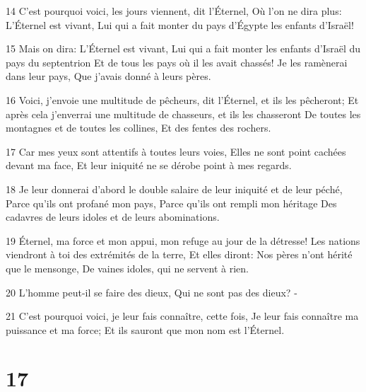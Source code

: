 \par 14 C'est pourquoi voici, les jours viennent, dit l'Éternel, Où l'on ne dira plus: L'Éternel est vivant, Lui qui a fait monter du pays d'Égypte les enfants d'Israël!
\par 15 Mais on dira: L'Éternel est vivant, Lui qui a fait monter les enfants d'Israël du pays du septentrion Et de tous les pays où il les avait chassés! Je les ramènerai dans leur pays, Que j'avais donné à leurs pères.
\par 16 Voici, j'envoie une multitude de pêcheurs, dit l'Éternel, et ils les pêcheront; Et après cela j'enverrai une multitude de chasseurs, et ils les chasseront De toutes les montagnes et de toutes les collines, Et des fentes des rochers.
\par 17 Car mes yeux sont attentifs à toutes leurs voies, Elles ne sont point cachées devant ma face, Et leur iniquité ne se dérobe point à mes regards.
\par 18 Je leur donnerai d'abord le double salaire de leur iniquité et de leur péché, Parce qu'ils ont profané mon pays, Parce qu'ils ont rempli mon héritage Des cadavres de leurs idoles et de leurs abominations.
\par 19 Éternel, ma force et mon appui, mon refuge au jour de la détresse! Les nations viendront à toi des extrémités de la terre, Et elles diront: Nos pères n'ont hérité que le mensonge, De vaines idoles, qui ne servent à rien.
\par 20 L'homme peut-il se faire des dieux, Qui ne sont pas des dieux? -
\par 21 C'est pourquoi voici, je leur fais connaître, cette fois, Je leur fais connaître ma puissance et ma force; Et ils sauront que mon nom est l'Éternel.

\chapter{17}


